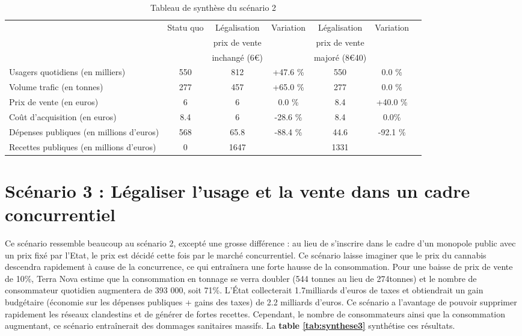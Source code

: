  \begin{table}[p]\centering
 \hspace{-2cm}\begin{tabular}{p{3.8cm}|cccccc}
  &Statu quo& Légalisation		& Variation & Légalisation	& Variation \\
  &   		& prix de vente		&			& prix de vente		&			\\
  &  		& inchangé (6\euro)	&			& majoré (8\euro 40)& 			\\\hline \hline   
  Usagers quotidiens (en milliers)  & 550  	&812  	&+47.6 \%  	&550  	&0.0 \% \\\hline
  Volume trafic  (en tonnes)  		& 277  	&457  	&+65.0 \%  	&277  	&0.0 \% \\\hline
  Prix de vente (en euros)  		& 6  	&6  	&0.0 \% 	& 8.4  	&+40.0 \%\\\hline
  Coût d’acquisition (en euros) 	& 8.4	&6 		& -28.6 \%  &8.4  	&0.0\%\\\hline
  Dépenses publiques (en millions d’euros) 	& 568  	&65.8       &-88.4 \%  &44.6  &-92.1 \%\\ \hline
  Recettes publiques (en millions d’euros)	&0		& 1647	&& 1331 &\\\hline
 \end{tabular}
 \label{tab:synthese2}
 \caption{Tableau de synthèse du scénario 2 \cite{terraNova_rapport}}
\end{table} 
 
 
\section{Scénario 3 : Légaliser l’usage et la vente dans un cadre concurrentiel}
 
Ce scénario ressemble beaucoup au scénario 2, excepté une grosse différence : au lieu de s’inscrire dans le cadre d’un monopole public avec un prix fixé par l’Etat, le prix est décidé cette fois par le marché concurrentiel.
Ce scénario laisse imaginer que le prix du cannabis descendra rapidement à cause de la concurrence, ce qui entraînera une forte hausse de la consommation.
Pour une baisse de prix de vente de 10\%, Terra Nova estime que la consommation en tonnage se verra doubler (544 tonnes au lieu de 274tonnes) et le nombre de consommateur quotidien augmentera de 393 000, soit 71\%.
L’État collecterait 1.7milliards d’euros  de taxes et obtiendrait un gain budgétaire (économie sur les dépenses publiques + gains des taxes) de 2.2 milliards d’euros.
Ce scénario a l’avantage de pouvoir supprimer rapidement les réseaux clandestins et de générer de fortes recettes. Cependant, le nombre de consommateurs ainsi que la consommation augmentant, ce scénario entraînerait des dommages sanitaires massifs. La \textbf{table \ref{tab:synthese3}} synthétise ces résultats.
 

